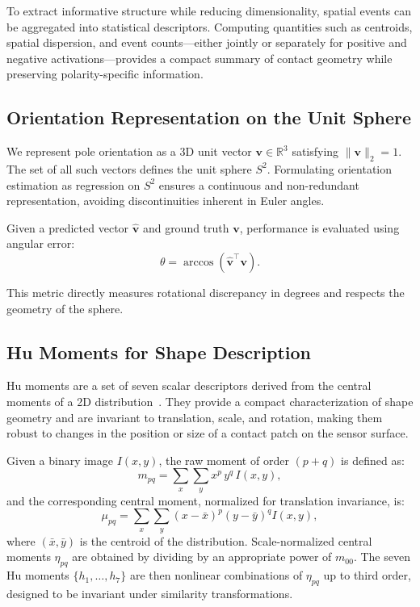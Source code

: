 \documentclass{article}
\begin{document}
    To extract informative structure while reducing dimensionality, spatial events can be aggregated into statistical descriptors. Computing quantities such as centroids, spatial dispersion, and event counts—either jointly or separately for positive and negative activations—provides a compact summary of contact geometry while preserving polarity-specific information.
     
    \subsection{Orientation Representation on the Unit Sphere}
    
    We represent pole orientation as a 3D unit vector $\mathbf{v} \in \mathbb{R}^3$ satisfying $\|\mathbf{v}\|_2 = 1$. The set of all such vectors defines the unit sphere $S^2$. Formulating orientation estimation as regression on $S^2$ ensures a continuous and non-redundant representation, avoiding discontinuities inherent in Euler angles.
    
    Given a predicted vector $\hat{\mathbf{v}}$ and ground truth $\mathbf{v}$, performance is evaluated using angular error:
    $$
    \theta = \arccos \left( \hat{\mathbf{v}}^\top \mathbf{v} \right).
    $$
    
    This metric directly measures rotational discrepancy in degrees and respects the geometry of the sphere.
    
    \subsection{Hu Moments for Shape Description}

    Hu moments are a set of seven scalar descriptors derived from the central moments of a 2D distribution~\cite{humom}. They provide a compact characterization of shape geometry and are invariant to translation, scale, and rotation, making them robust to changes in the position or size of a contact patch on the sensor surface.

    Given a binary image $I(x,y)$, the raw moment of order $(p+q)$ is defined as:
    \[
    m_{pq} = \sum_{x}\sum_{y} x^p \, y^q \, I(x,y),
    \]
    and the corresponding central moment, normalized for translation invariance, is:
    \[
    \mu_{pq} = \sum_{x}\sum_{y} (x - \bar{x})^p (y - \bar{y})^q I(x,y),
    \]
    where $(\bar{x}, \bar{y})$ is the centroid of the distribution. Scale-normalized central moments $\eta_{pq}$ are obtained by dividing by an appropriate power of $m_{00}$. The seven Hu moments $\{h_1, \dots, h_7\}$ are then nonlinear combinations of $\eta_{pq}$ up to third order, designed to be invariant under similarity transformations.
\end{document}
